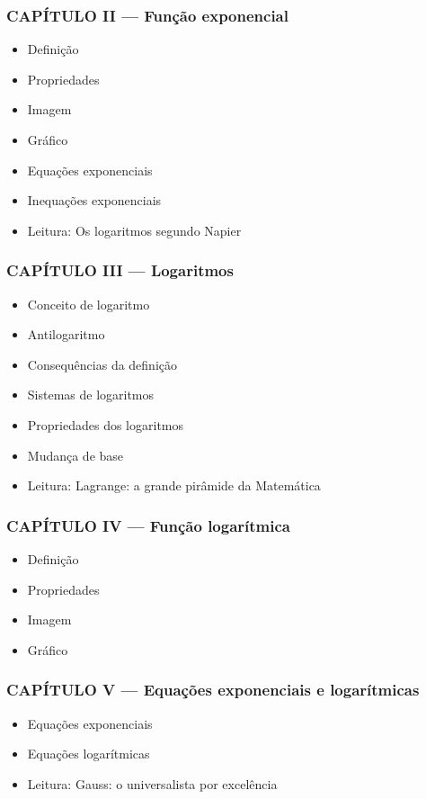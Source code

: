 \documentclass[a4paper,12pt]{article}[abntex2]
\begin{document}
\subsubsection*{CAPÍTULO II — Função exponencial}

\begin{itemize}
\item Definição
\item Propriedades
\item Imagem
\item Gráfico
\item Equações exponenciais
\item Inequações exponenciais
\item Leitura: Os logaritmos segundo Napier
\end{itemize}
\subsubsection*{CAPÍTULO III — Logaritmos}

\begin{itemize}
\item Conceito de logaritmo
\item Antilogaritmo
\item Consequências da definição
\item Sistemas de logaritmos
\item Propriedades dos logaritmos
\item Mudança de base
\item Leitura: Lagrange: a grande pirâmide da Matemática
\end{itemize}
\subsubsection*{CAPÍTULO IV — Função logarítmica}

\begin{itemize}
\item Definição
\item Propriedades
\item Imagem
\item Gráfico
\end{itemize}
\subsubsection*{CAPÍTULO V — Equações exponenciais e logarítmicas}

\begin{itemize}
\item Equações exponenciais
\item Equações logarítmicas
\item Leitura: Gauss: o universalista por excelência
\end{itemize}
\end{document}

